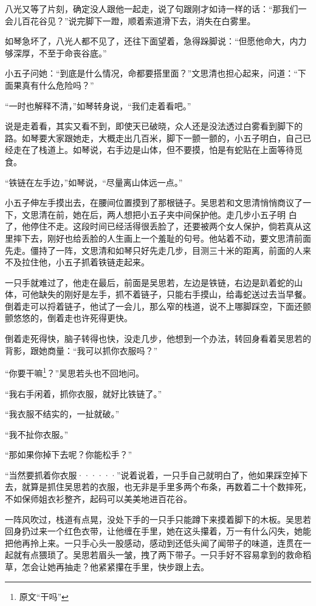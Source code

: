 八光又等了片刻，确定没人跟他一起走，说了句跟刚才如诗一样的话：“那我们一会儿百花谷见？”说完脚下一蹬，顺着索道滑下去，消失在白雾里。

如琴急坏了，八光人都不见了，还往下面望着，急得跺脚说：“但愿他命大，内力够深厚，不至于命丧谷底。”

小五子问她：“到底是什么情况，命都要搭里面？”文思清也担心起来，问道：“下面果真有什么危险吗？”

“一时也解释不清，”如琴转身说，“我们走着看吧。”

说是走着看，其实又看不到，即使天已破晓，众人还是没法透过白雾看到脚下的路。如琴要大家跟她走，大概走出几百米，脚下一颤一颤的，小五子明白，自己已经走在了栈道上。如琴说，右手边是山体，但不要摸，怕是有蛇贴在上面等待觅食。

“铁链在左手边，”如琴说，“尽量离山体远一点。”

小五子伸左手摸出去，在腰间位置摸到了那根链子。吴思若和文思清悄悄商议了一下，文思清在前，她在后，两人想把小五子夹中间保护他。走几步小五子明
白了，他停住不走。这段时间已经活得很丢脸了，还要被两个女人保护，倘若真从这里摔下去，刚好也给丢脸的人生画上一个羞耻的句号。他站着不动，要文思清前面先走。僵持了一阵，文思清和如琴只好先走几步，目测三十米的距离，前面的人来不及拉住他，小五子抓着铁链走起来。

一只手就难过了，他走在最后，前面是吴思若，左边是铁链，右边是趴着蛇的山体，可他缺失的刚好是左手，抓不着链子，只能右手摸山，给毒蛇送过去当早餐。倒着走可以捋着链子，他试了一会儿，那么窄的栈道，说不上哪脚踩空，下面还颤颤悠悠的，倒着走也许死得更快。

倒着走死得快，脑子转得也快，没走几步，他想到一个办法，转回身看着吴思若的背影，跟她商量：“我可以抓你衣服吗？”

“你要干嘛\footnote{原文“干吗”}？”吴思若头也不回地问。

“我右手闲着，抓你衣服，就好比铁链了。”

“我衣服不结实的，一扯就破。”

“我不扯你衣服。”

“那如果你掉下去呢？你能松手？”

“当然要抓着你衣服······”说着说着，一只手自己就明白了，他如果踩空掉下去，就算是抓住吴思若的衣服，也无非是手里多两个布条，再数着二十个数摔死，不如保师姐衣衫整齐，起码可以美美地进百花谷。

一阵风吹过，栈道有点晃，没处下手的一只手只能蹲下来摸着脚下的木板。吴思若回身扔过来一个红色衣带，让他缠在手里，她在这头攥着，万一有什么闪失，她能把他再拎上来。一只手心头一股感动，感动到还低头闻了闻带子的味道，连贯在一起就有点猥琐了。吴思若眉头一皱，拽了两下带子。一只手好不容易拿到的救命稻草，怎会让她再抽走？他紧紧攥在手里，快步跟上去。

